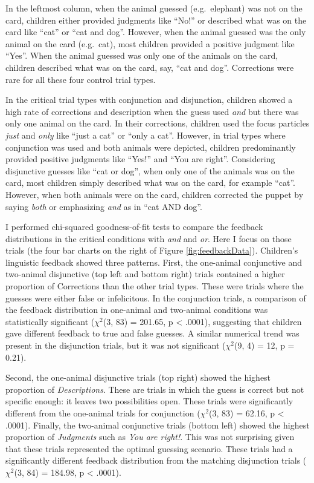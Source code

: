 \documentclass[man]{apa6}
\theoremstyle{definition}
\theoremstyle{definition}
\theoremstyle{definition}
\theoremstyle{remark}
\begin{document}
In the leftmost column, when the animal guessed (e.g.~elephant) was not
on the card, children either provided judgments like \enquote{No!} or
described what was on the card like \enquote{cat} or \enquote{cat and
dog}. However, when the animal guessed was the only animal on the card
(e.g.~cat), most children provided a positive judgment like
\enquote{Yes}. When the animal guessed was only one of the animals on
the card, children described what was on the card, say, \enquote{cat and
dog}. Corrections were rare for all these four control trial types.

In the critical trial types with conjunction and disjunction, children
showed a high rate of corrections and description when the guess used
\emph{and} but there was only one animal on the card. In their
corrections, children used the focus particles \emph{just} and
\emph{only} like \enquote{just a cat} or \enquote{only a cat}. However,
in trial types where conjunction was used and both animals were
depicted, children predominantly provided positive judgments like
\enquote{Yes!} and \enquote{You are right}. Considering disjunctive
guesses like \enquote{cat or dog}, when only one of the animals was on
the card, most children simply described what was on the card, for
example \enquote{cat}. However, when both animals were on the card,
children corrected the puppet by saying \emph{both} or emphasizing
\emph{and} as in \enquote{cat AND dog}.

I performed chi-squared goodness-of-fit tests to compare the feedback
distributions in the critical conditions with \emph{and} and \emph{or}.
Here I focus on those trials (the four bar charts on the right of Figure
\ref{fig:feedbackData}). Children's linguistic feedback showed three
patterns. First, the one-animal conjunctive and two-animal disjunctive
(top left and bottom right) trials contained a higher proportion of
Corrections than the other trial types. These were trials where the
guesses were either false or infelicitous. In the conjunction trials, a
comparison of the feedback distribution in one-animal and two-animal
conditions was statistically significant (\(\chi^2\)(3, 83) = 201.65, p
\textless{} .0001), suggesting that children gave different feedback to
true and false guesses. A similar numerical trend was present in the
disjunction trials, but it was not significant (\(\chi^2\)(9, 4) = 12, p
= 0.21).

Second, the one-animal disjunctive trials (top right) showed the highest
proportion of \emph{Descriptions}. These are trials in which the guess
is correct but not specific enough: it leaves two possibilities open.
These trials were significantly different from the one-animal trials for
conjunction (\(\chi^2\)(3, 83) = 62.16, p \textless{} .0001). Finally,
the two-animal conjunctive trials (bottom left) showed the highest
proportion of \emph{Judgments} such as \emph{You are right!}. This was
not surprising given that these trials represented the optimal guessing
scenario. These trials had a significantly different feedback
distribution from the matching disjunction trials (\(\chi^2\)(3, 84) =
184.98, p \textless{} .0001).
\end{document}
